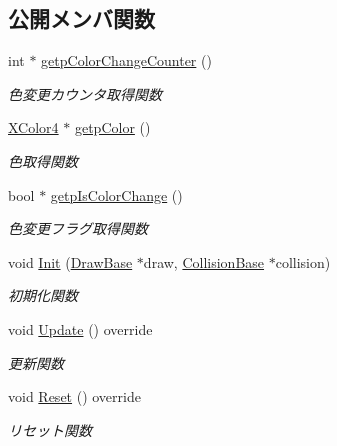 \subsection*{公開メンバ関数}
\begin{DoxyCompactItemize}
\item 
int $\ast$ \mbox{\hyperlink{class_coin_a968709417a7ccf16ec90cdc57d0d8582}{getp\+Color\+Change\+Counter}} ()
\begin{DoxyCompactList}\small\item\em 色変更カウンタ取得関数 \end{DoxyCompactList}\item 
\mbox{\hyperlink{_vector3_d_8h_a680c30c4a07d86fe763c7e01169cd6cc}{X\+Color4}} $\ast$ \mbox{\hyperlink{class_coin_aade96d8bc4eb1ced29e998f49add22ef}{getp\+Color}} ()
\begin{DoxyCompactList}\small\item\em 色取得関数 \end{DoxyCompactList}\item 
bool $\ast$ \mbox{\hyperlink{class_coin_a6354f3bc595e0fc93c28d8e5c43b5e39}{getp\+Is\+Color\+Change}} ()
\begin{DoxyCompactList}\small\item\em 色変更フラグ取得関数 \end{DoxyCompactList}\item 
void \mbox{\hyperlink{class_coin_aecb007762f15ecc91cd6a699e60c2e19}{Init}} (\mbox{\hyperlink{class_draw_base}{Draw\+Base}} $\ast$draw, \mbox{\hyperlink{class_collision_base}{Collision\+Base}} $\ast$collision)
\begin{DoxyCompactList}\small\item\em 初期化関数 \end{DoxyCompactList}\item 
void \mbox{\hyperlink{class_coin_a6969409d8c97fc0f51dfe10d5b5072c6}{Update}} () override
\begin{DoxyCompactList}\small\item\em 更新関数 \end{DoxyCompactList}\item 
void \mbox{\hyperlink{class_coin_a52c50229ce7c1e0f459e198adac70c8d}{Reset}} () override
\begin{DoxyCompactList}\small\item\em リセット関数 \end{DoxyCompactList}\end{DoxyCompactItemize}
